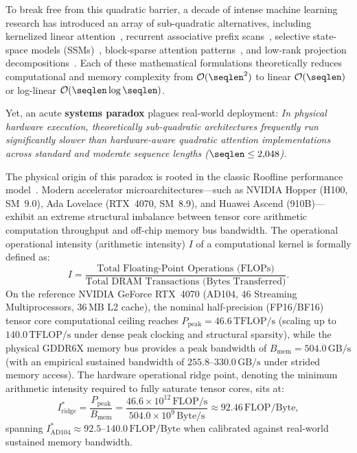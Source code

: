 To break free from this quadratic barrier, a decade of intense machine learning research has introduced an array of sub-quadratic alternatives, including kernelized linear attention~\cite{katharopoulos2020transformers,choromanski2021rethinking}, recurrent associative prefix scans~\cite{sun2023retentive,yang2023gated,schlag2021deltanet}, selective state-space models (SSMs)~\cite{gu2022mamba,dao2024mamba2}, block-sparse attention patterns~\cite{beltagy2020longformer,zaheer2020bigbird}, and low-rank projection decompositions~\cite{wang2020linformer,wang2024svdllm,yuan2023asvd}.
Each of these mathematical formulations theoretically reduces computational and memory complexity from $\mathcal{O}(\seqlen^2)$ to linear $\mathcal{O}(\seqlen)$ or log-linear $\mathcal{O}(\seqlen \log \seqlen)$.

Yet, an acute \textbf{systems paradox} plagues real-world deployment:
\emph{In physical hardware execution, theoretically sub-quadratic architectures frequently run significantly slower than hardware-aware quadratic attention implementations across standard and moderate sequence lengths ($\seqlen \le 2{,}048$).}

The physical origin of this paradox is rooted in the classic Roofline performance model~\cite{williams2009roofline}.
Modern accelerator microarchitectures—such as NVIDIA Hopper (H100, SM~9.0), Ada Lovelace (RTX~4070, SM~8.9), and Huawei Ascend (910B)—exhibit an extreme structural imbalance between tensor core arithmetic computation throughput and off-chip memory bus bandwidth.
The operational operational intensity (arithmetic intensity) $I$ of a computational kernel is formally defined as:
\begin{equation}
\label{eq:arithmetic_intensity_def}
I = \frac{\text{Total Floating-Point Operations (FLOPs)}}{\text{Total DRAM Transactions (Bytes Transferred)}}.
\end{equation}
On the reference NVIDIA GeForce RTX~4070 (AD104, 46 Streaming Multiprocessors, $36\,\text{MB}$ L2 cache), the nominal half-precision (FP16/BF16) tensor core computational ceiling reaches $P_{\text{peak}} = 46.6\,\text{TFLOP/s}$ (scaling up to $140.0\,\text{TFLOP/s}$ under dense peak clocking and structural sparsity), while the physical GDDR6X memory bus provides a peak bandwidth of $B_{\text{mem}} = 504.0\,\text{GB/s}$ (with an empirical sustained bandwidth of $255.8\text{--}330.0\,\text{GB/s}$ under strided memory access).
The hardware operational ridge point, denoting the minimum arithmetic intensity required to fully saturate tensor cores, sits at:
\begin{equation}
\label{eq:ridge_point_rtx4070}
I^*_{\text{ridge}} = \frac{P_{\text{peak}}}{B_{\text{mem}}} = \frac{46.6 \times 10^{12}\,\text{FLOP/s}}{504.0 \times 10^9\,\text{Byte/s}} \approx 92.46\,\text{FLOP/Byte},
\end{equation}
spanning $I^*_{\text{AD104}} \approx 92.5\text{--}140.0\,\text{FLOP/Byte}$ when calibrated against real-world sustained memory bandwidth.

